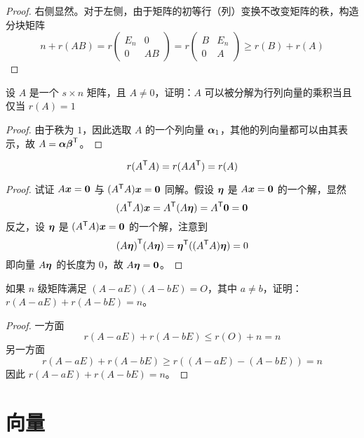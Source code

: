 \begin{proof}
	右侧显然。对于左侧，由于矩阵的初等行（列）变换不改变矩阵的秩，构造分块矩阵
	\[ n + r(AB) = r \left(\begin{matrix}
				E_n & 0 \\ 0 & AB
			\end{matrix}\right) = r\left(\begin{matrix}
				B & E_n \\ 0 & A
			\end{matrix}\right) \geqslant r(B) + r(A) \]
\end{proof}

\begin{theorem}
	设 $A$ 是一个 $s \times n$ 矩阵，且 $A \neq 0$，证明：$A$ 可以被分解为行列向量的乘积当且仅当 $r(A) = 1$
\end{theorem}

\begin{proof}
	由于秩为 $1$，因此选取 $A$ 的一个列向量 $\boldsymbol{\alpha}_1$，其他的列向量都可以由其表示，故 $A = \boldsymbol{\alpha} {\boldsymbol{\beta}}^\mathsf{T}$。
\end{proof}

\begin{theorem}
	\[ r({A}^\mathsf{T}A) = r(A {A}^\mathsf{T}) = r(A) \]
\end{theorem}

\begin{proof}
	试证 $A\boldsymbol{x} = \boldsymbol{0}$ 与 $({A}^\mathsf{T}A) \boldsymbol{x} = \boldsymbol{0}$ 同解。假设 $\boldsymbol{\eta}$ 是 $A \boldsymbol{x} = \boldsymbol{0}$ 的一个解，显然
	\[ ({A}^\mathsf{T}A) \boldsymbol{x} = {A}^\mathsf{T} (A \boldsymbol{\eta}) = {A}^\mathsf{T} \boldsymbol{0} = \boldsymbol{0} \]
	反之，设 $\boldsymbol{\eta}$ 是 $({A}^\mathsf{T}A) \boldsymbol{x} = \boldsymbol{0}$ 的一个解，注意到
	\[ {(A \boldsymbol{\eta})}^\mathsf{T}(A \boldsymbol{\eta}) = {\boldsymbol{\eta}}^\mathsf{T} (({A}^\mathsf{T}A) \boldsymbol{\eta}) = 0 \]
	即向量 $A \boldsymbol{\eta}$ 的长度为 $0$，故 $A \boldsymbol{\eta} = \boldsymbol{0}$。
\end{proof}

\begin{theorem}
	如果 $n$ 级矩阵满足 $(A - aE)(A - bE) = O$，其中 $a \neq b$，证明：$r(A - aE) + r(A - bE) = n$。
\end{theorem}

\begin{proof}
	一方面
	\[ r(A - aE) + r(A - bE) \leqslant r(O) + n = n \]
	另一方面
	\[ r(A - aE) + r(A - bE) \geqslant r((A - aE) - (A - bE)) = n \]
	因此 $r(A - aE) + r(A - bE) = n$。
\end{proof}

\section{向量}


